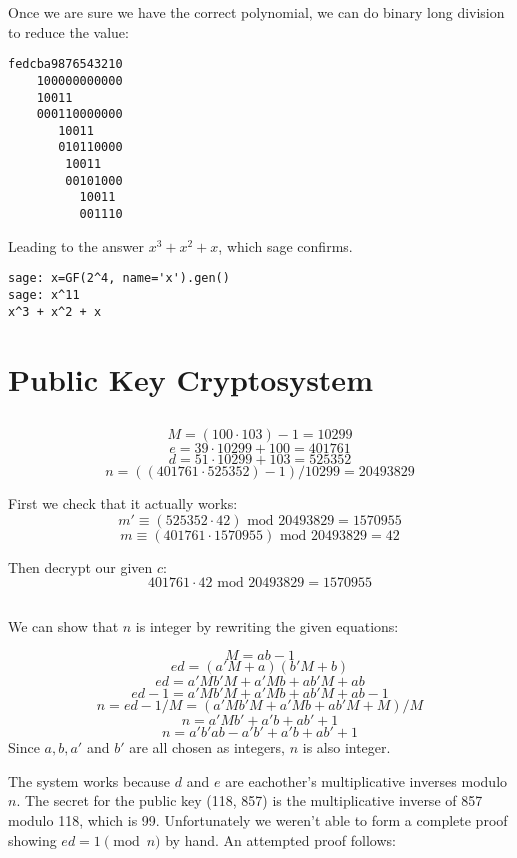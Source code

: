 \documentclass{article}
\begin{document}
Once we are sure we have the correct polynomial, we can do binary long division to reduce the value:

\begin{verbatim}
fedcba9876543210
    100000000000
    10011
    000110000000
       10011
       010110000
        10011
        00101000
          10011
          001110
\end{verbatim}

Leading to the answer $x^3 + x^2 + x$, which sage confirms.

\begin{verbatim}
sage: x=GF(2^4, name='x').gen()
sage: x^11
x^3 + x^2 + x
\end{verbatim}

\section{Public Key Cryptosystem}

\subsection{}
\[M = (100 \cdot 103)-1=10299 \]
\[e = 39 \cdot 10299 + 100 = 401761\]
\[d = 51 \cdot 10299 + 103 = 525352\]
\[n = ((401761 \cdot 525352)-1)/10299 = 20493829\]

First we check that it actually works:
\[m'\equiv (525352 \cdot 42) \mbox{ mod 20493829} = 1570955\]
\[m\equiv (401761 \cdot 1570955) \mbox{ mod 20493829} = 42\]

Then decrypt our given $c$:
\[ 401761 \cdot 42 \mbox{ mod 20493829} = 1570955 \]


\subsection{}
We can show that $n$ is integer by rewriting the given equations:

\[M=ab-1 \]
\[ed=(a'M+a)(b'M+b)\]
\[ed=a'Mb'M + a'Mb + ab'M + ab \]
\[ed-1=a'Mb'M + a'Mb + ab'M + ab-1 \]
\[n=ed-1/M=(a'Mb'M + a'Mb  + ab'M + M)/M \]
\[n=a'Mb' + a'b  + ab' + 1 \]
\[n=a'b'ab - a'b' + a'b  + ab' + 1 \]
Since $a, b, a'$ and $b'$ are all chosen as integers, $n$ is also integer.

The system works because $d$ and $e$ are eachother's multiplicative inverses modulo $n$.
The secret for the public key (118, 857) is the multiplicative inverse of 857 modulo 118, which is 99.
Unfortunately we weren't able to form a complete proof showing $ed = 1 \pmod n$ by hand.
An attempted proof follows:
\newpage
\end{document}
